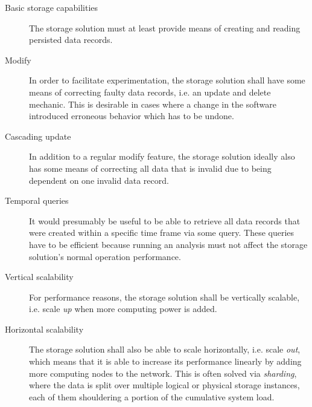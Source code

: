\begin{description}
\item [Basic storage capabilities]
The storage solution must at least provide means of creating and reading persisted data records.
\item [Modify]
In order to facilitate experimentation, the storage solution shall have some means of correcting faulty data records, i.e. an update and delete mechanic.
This is desirable in cases where a change in the software introduced erroneous behavior which has to be undone.
\item [Cascading update]
In addition to a regular modify feature, the storage solution ideally also has some means of correcting all data that is invalid due to being dependent on one invalid data record.
\item [Temporal queries]
It would presumably be useful to be able to retrieve all data records that were created within a specific time frame via some query.
These queries have to be efficient because running an analysis must not affect the storage solution's normal operation performance.
\item [Vertical scalability]
For performance reasons, the storage solution shall be vertically scalable, i.e. scale \emph{up} when more computing power is added.
\item [Horizontal scalability]
The storage solution shall also be able to scale horizontally, i.e. scale \emph{out}, which means that it is able to increase its performance linearly by adding more computing nodes to the network.
This is often solved via \emph{sharding}, where the data is split over multiple logical or physical storage instances, each of them shouldering a portion of the cumulative system load.

\end{description}
